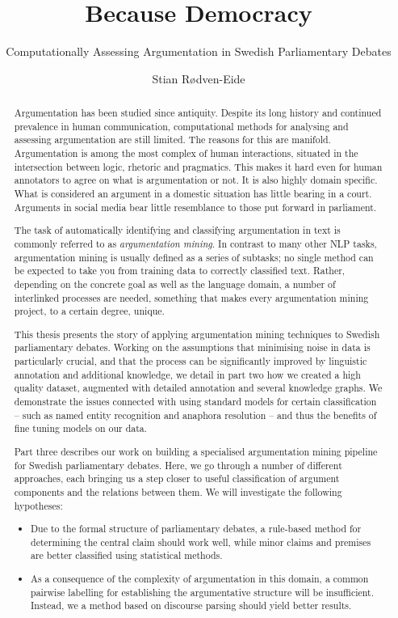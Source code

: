\documentclass[11pt,a4paper]{DL}
\title{Because Democracy}
\subtitle{Computationally Assessing Argumentation in Swedish Parliamentary Debates}
\author{Stian Rødven-Eide}
\begin{document}
\maketitle
\frontmatter

\begin{abstract}
    Argumentation has been studied since antiquity. Despite its long history and continued prevalence in human communication, computational methods for analysing and assessing argumentation are still limited. The reasons for this are manifold. Argumentation is among the most complex of human interactions, situated in the intersection between logic, rhetoric and pragmatics. This makes it hard even for human annotators to agree on what is argumentation or not. It is also highly domain specific. What is considered an argument in a domestic situation has little bearing in a court. Arguments in social media bear little resemblance to those put forward in parliament.
    
    The task of automatically identifying and classifying argumentation in text is commonly referred to as \emph{argumentation mining}. In contrast to many other NLP tasks, argumentation mining is usually defined as a series of subtasks; no single method can be expected to take you from training data to correctly classified text. Rather, depending on the concrete goal as well as the language domain, a number of interlinked processes are needed, something that makes every argumentation mining project, to a certain degree, unique.
    
    This thesis presents the story of applying argumentation mining techniques to Swedish parliamentary debates. Working on the assumptions that minimising noise in data is particularly crucial, and that the process can be significantly improved by linguistic annotation and additional knowledge, we detail in part two how we created a high quality dataset, augmented with detailed annotation and several knowledge graphs. We demonstrate the issues connected with using standard models for certain classification -- such as named entity recognition and anaphora resolution -- and thus the benefits of fine tuning models on our data.
    
    Part three describes our work on building a specialised argumentation mining pipeline for Swedish parliamentary debates. Here, we go through a number of different approaches, each bringing us a step closer to useful classification of argument components and the relations between them. We will investigate the following hypotheses:
    \begin{itemize}
        \item Due to the formal structure of parliamentary debates, a rule-based method for determining the central claim should work well, while minor claims and premises are better classified using statistical methods.
        \item As a consequence of the complexity of argumentation in this domain, a common pairwise labelling for establishing the argumentative structure will be insufficient. Instead, we a method based on discourse parsing should yield better results.
    \end{itemize}
     

\end{abstract}
\end{document}
